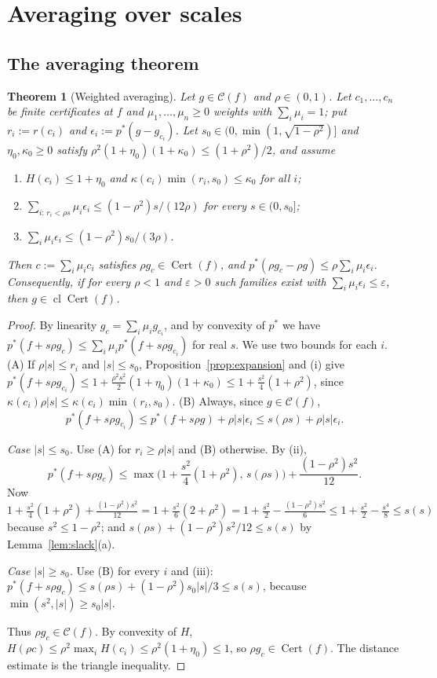 \documentclass[10pt]{amsart}
\newtheorem{theorem}{Theorem}[section]
\theoremstyle{definition}
\theoremstyle{remark}
\newcommand{\Cset}{\mathcal C}
\newcommand{\Cert}{\operatorname{Cert}}
\newcommand{\cl}{\operatorname{cl}}
\begin{document}
\section{Averaging over scales}\label{sec:averaging}

\subsection{The averaging theorem}

\begin{theorem}[Weighted averaging]\label{thm:averaging}
Let $g\in\Cset(f)$ and $\rho\in(0,1)$.  Let $c_1,\dots,c_n$ be finite
certificates at $f$ and $\mu_1,\dots,\mu_n\ge0$ weights with
$\sum_i\mu_i=1$; put $r_i:=r(c_i)$ and $\epsilon_i:=p^*(g-g_{c_i})$.  Let
$s_0\in(0,\min(1,\sqrt{1-\rho^2})]$ and $\eta_0,\kappa_0\ge0$ satisfy
$\rho^2(1+\eta_0)(1+\kappa_0)\le(1+\rho^2)/2$, and assume
\begin{enumerate}
\item[(i)] $H(c_i)\le1+\eta_0$ and $\kappa(c_i)\min(r_i,s_0)\le\kappa_0$
for all $i$;
\item[(ii)] $\sum_{i:\,r_i<\rho s}\mu_i\epsilon_i\le(1-\rho^2)s/(12\rho)$ for every
$s\in(0,s_0]$;
\item[(iii)] $\sum_i\mu_i\epsilon_i\le(1-\rho^2)s_0/(3\rho)$.
\end{enumerate}
Then $c:=\sum_i\mu_ic_i$ satisfies $\rho g_c\in\Cert(f)$, and
$p^*(\rho g_c-\rho g)\le\rho\sum_i\mu_i\epsilon_i$.  Consequently, if for every
$\rho<1$ and $\varepsilon>0$ such families exist with
$\sum_i\mu_i\epsilon_i\le\varepsilon$, then $g\in\cl\Cert(f)$.
\end{theorem}

\begin{proof}
By linearity $g_c=\sum_i\mu_ig_{c_i}$, and by convexity of $p^*$ we
have $p^*(f+s\rho g_c)\le\sum_i\mu_ip^*(f+s\rho g_{c_i})$ for real $s$.  We
use two bounds for each $i$.  (A) If $\rho|s|\le r_i$ and $|s|\le s_0$,
Proposition~\ref{prop:expansion} and (i) give
$p^*(f+s\rho g_{c_i})\le1+\frac{\rho^2s^2}2(1+\eta_0)(1+\kappa_0)\le
1+\frac{s^2}4(1+\rho^2)$, since $\kappa(c_i)\rho|s|\le\kappa(c_i)
\min(r_i,s_0)$.  (B) Always, since $g\in\Cset(f)$,
\[
 p^*(f+s\rho g_{c_i})\le p^*(f+s\rho g)+\rho|s|\epsilon_i\le s(\rho s)
 +\rho|s|\epsilon_i.
\]

\emph{Case $|s|\le s_0$.}  Use (A) for $r_i\ge\rho|s|$ and (B) otherwise.
By (ii),
\[
 p^*(f+s\rho g_c)\le\max\Big(1+\frac{s^2}4(1+\rho^2),\,s(\rho s)\Big)
 +\frac{(1-\rho^2)s^2}{12}.
\]
Now $1+\frac{s^2}4(1+\rho^2)+\frac{(1-\rho^2)s^2}{12}=1+\frac{s^2}{6}
(2+\rho^2)=1+\frac{s^2}2-\frac{(1-\rho^2)s^2}6\le1+\frac{s^2}2-\frac{s^4}8
\le s(s)$ because $s^2\le1-\rho^2$; and $s(\rho s)+(1-\rho^2)s^2/12\le s(s)$
by Lemma~\ref{lem:slack}(a).

\emph{Case $|s|\ge s_0$.}  Use (B) for every $i$ and (iii):
$p^*(f+s\rho g_c)\le s(\rho s)+(1-\rho^2)s_0|s|/3\le s(s)$, because
$\min(s^2,|s|)\ge s_0|s|$.

Thus $\rho g_c\in\Cset(f)$.  By convexity of $H$,
$H(\rho c)\le\rho^2\max_iH(c_i)\le\rho^2(1+\eta_0)\le1$, so $\rho
g_c\in\Cert(f)$.  The distance estimate is the triangle inequality.
\end{proof}
\end{document}
